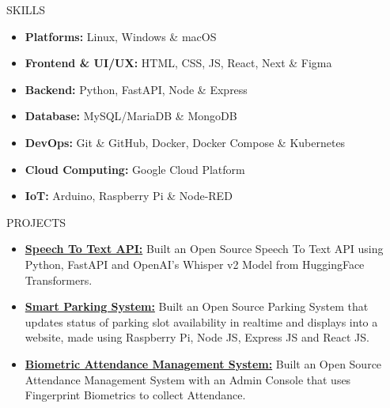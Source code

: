 \documentclass{resume}
\begin{document}
\vspace{-0.4em}

\begin{rSection}{SKILLS}
\begin{itemize}
    \item \textbf{Platforms:} Linux, Windows \& macOS
    \vspace{-0.4em}
    \item \textbf{Frontend \& UI/UX: } HTML, CSS, JS, React, Next \& Figma
    \vspace{-0.4em}
    \item \textbf{Backend: } Python, FastAPI, Node \& Express
    \vspace{-0.4em}
    \item \textbf{Database: } MySQL/MariaDB \& MongoDB
    \vspace{-0.4em}
    \item \textbf{DevOps:} Git \& GitHub, Docker, Docker Compose \& Kubernetes
    \vspace{-0.4em}
    \item \textbf{Cloud Computing:} Google Cloud Platform
    \vspace{-0.4em}
    \item \textbf{IoT:} Arduino, Raspberry Pi \& Node-RED
\end{itemize}
\end{rSection}
\vspace{-0.4em}

\begin{rSection}{PROJECTS}
\begin{itemize}
    \item \textbf{\href{https://github.com/Arkapravo-Ghosh/speech-to-text}{Speech To Text API:}} {Built an Open Source Speech To Text API using Python, FastAPI and OpenAI's Whisper v2 Model from HuggingFace Transformers.}
    \vspace{-0.4em}
    \item \textbf{\href{https://github.com/Arkapravo-Ghosh/Smart-Parking-System}{Smart Parking System:}} {Built an Open Source Parking System that updates status of parking slot availability in realtime and displays into a website, made using Raspberry Pi, Node JS, Express JS and React JS.}
    \vspace{-0.4em}
    \item \textbf{\href{https://github.com/Arkapravo-Ghosh/attendance-monitoring-system}{Biometric Attendance Management System:}} {Built an Open Source Attendance Management System with an Admin Console that uses Fingerprint Biometrics to collect Attendance.}
\end{itemize}
\end{rSection}
\vspace{-0.4em}
\end{document}

